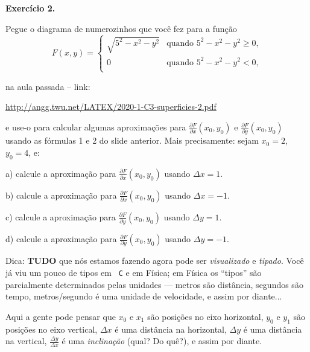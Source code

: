 \documentclass[oneside,12pt]{article}
\begin{document}
\newpage


{\bf Exercício 2.}

\ssk


Pegue o diagrama de numerozinhos que você fez para a função
%
$$ F(x,y) =
\begin{cases}
  \sqrt{5^2 - x^2 - y^2} & \text{quando $5^2 - x^2 - y^2≥0$}, \\
  0 & \text{quando $5^2 - x^2 - y^2<0$,} \\
 \end{cases}
$$

na aula passada -- link:

\ssk

\url{http://angg.twu.net/LATEX/2020-1-C3-superficies-2.pdf}

\ssk

e use-o para calcular algumas aproximações para
$\frac{∂F}{∂x}(x_0,y_0)$ e $\frac{∂F}{∂y}(x_0,y_0)$ usando as fórmulas
1 e 2 do slide anterior. Mais precisamente: sejam $x_0=2$, $y_0=4$, e:

\msk

a) calcule a aproximação para $\frac{∂F}{∂x}(x_0,y_0)$ usando $Δx=1$.

b) calcule a aproximação para $\frac{∂F}{∂x}(x_0,y_0)$ usando $Δx=-1$.

c) calcule a aproximação para $\frac{∂F}{∂y}(x_0,y_0)$ usando $Δy=1$.

d) calcule a aproximação para $\frac{∂F}{∂y}(x_0,y_0)$ usando $Δy=-1$.


\newpage


Dica: {\bf TUDO} que nós estamos fazendo agora pode ser {\sl
  visualizado} e {\sl tipado}. Você já viu um pouco de tipos em {\tt
  C} e em Física; em Física os ``tipos'' são parcialmente determinados
pelas unidades --- metros são distância, segundos são tempo,
metros/segundo é uma unidade de velocidade, e assim por diante...

Aqui a gente pode pensar que $x_0$ e $x_1$ são posições no eixo
horizontal, $y_0$ e $y_1$ são posições no eixo vertical, $Δx$ é uma
distância na horizontal, $Δy$ é uma distância na vertical,
$\frac{Δy}{Δx}$ é uma {\sl inclinação} (qual? Do quê?), e assim por
diante.
\end{document}
